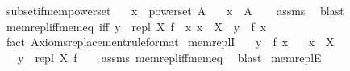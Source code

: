 \begin{isabellebody}
%
\isadelimproof
\isanewline
%
\endisadelimproof
\isanewline
{}\isamarkupfalse%
\ subset{\isacharunderscore}{\kern0pt}if{\isacharunderscore}{\kern0pt}mem{\isacharunderscore}{\kern0pt}powerset{\isacharcolon}{\kern0pt}\isanewline
\ \ \ {\isachardoublequoteopen}x\ {\isasymin}\ powerset\ A{\isachardoublequoteclose}\isanewline
\ \ \ {\isachardoublequoteopen}x\ {\isasymsubseteq}\ A{\isachardoublequoteclose}\isanewline
%
\isadelimproof
\ \ %
\endisadelimproof
%
\isatagproof
{}\isamarkupfalse%
\ assms\ \isamarkupfalse%
\ blast%
\endisatagproof
{\isafoldproof}%
%
\isadelimproof
\isanewline
%
\endisadelimproof
\isanewline
{}\isamarkupfalse%
\ mem{\isacharunderscore}{\kern0pt}repl{\isacharunderscore}{\kern0pt}iff{\isacharunderscore}{\kern0pt}mem{\isacharunderscore}{\kern0pt}eq\ {\isacharbrackleft}{\kern0pt}iff{\isacharbrackright}{\kern0pt}{\isacharcolon}{\kern0pt}\ {\isachardoublequoteopen}{\isacharparenleft}{\kern0pt}y\ {\isasymin}\ repl\ X\ f{\isacharparenright}{\kern0pt}\ {\isasymlongleftrightarrow}\ {\isacharparenleft}{\kern0pt}{\isasymexists}x{\isachardot}{\kern0pt}\ x\ {\isasymin}\ X\ {\isasymand}\ y\ {\isacharequal}{\kern0pt}\ f\ x{\isacharparenright}{\kern0pt}{\isachardoublequoteclose}\isanewline
%
\isadelimproof
\ \ %
\endisadelimproof
%
\isatagproof
{}\isamarkupfalse%
\ {\isacharparenleft}{\kern0pt}fact\ Axioms{\isachardot}{\kern0pt}replacement{\isacharbrackleft}{\kern0pt}rule{\isacharunderscore}{\kern0pt}format{\isacharbrackright}{\kern0pt}{\isacharparenright}{\kern0pt}%
\endisatagproof
{\isafoldproof}%
%
\isadelimproof
\isanewline
%
\endisadelimproof
\isanewline
{}\isamarkupfalse%
\ mem{\isacharunderscore}{\kern0pt}replI{\isacharcolon}{\kern0pt}\isanewline
\ \ \ {\isachardoublequoteopen}y\ {\isacharequal}{\kern0pt}\ f\ x{\isachardoublequoteclose}\isanewline
\ \ \ {\isachardoublequoteopen}x\ {\isasymin}\ X{\isachardoublequoteclose}\isanewline
\ \ \ {\isachardoublequoteopen}y\ {\isasymin}\ repl\ X\ f{\isachardoublequoteclose}\isanewline
%
\isadelimproof
\ \ %
\endisadelimproof
%
\isatagproof
{}\isamarkupfalse%
\ assms\ mem{\isacharunderscore}{\kern0pt}repl{\isacharunderscore}{\kern0pt}iff{\isacharunderscore}{\kern0pt}mem{\isacharunderscore}{\kern0pt}eq\ \isamarkupfalse%
\ blast%
\endisatagproof
{\isafoldproof}%
%
\isadelimproof
\isanewline
%
\endisadelimproof
\isanewline
{}\isamarkupfalse%
\ mem{\isacharunderscore}{\kern0pt}replE{\isacharcolon}{\kern0pt}\isanewline

\end{isabellebody}

